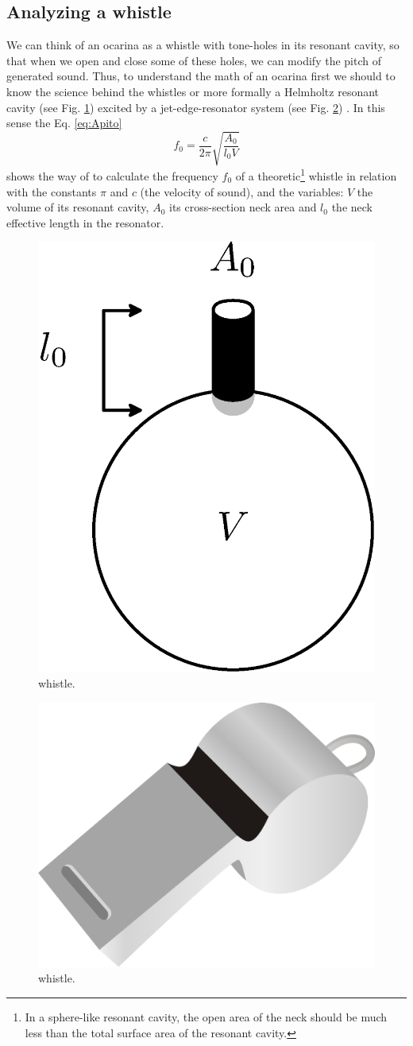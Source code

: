 \documentclass[11pt,twocolumn]{article}
\begin{document}
\subsection{Analyzing a whistle}
We can think of an ocarina as a whistle with tone-holes in its resonant cavity,
so that when we open and close some of these holes, we can modify the pitch of generated sound.
Thus, to understand the math of an ocarina first we should to know the science behind the whistles  
or more formally a Helmholtz resonant cavity \cite{corning2011resonance} (see Fig. \ref{fig:resonador}) excited by a jet-edge-resonator system (see Fig. \ref{football-referee-whistle}) \cite[pp. 3]{gibiat2013acoustic} \cite[pp. 138]{nyborg1953characteristics}. 
In this sense the Eq. \ref{eq:Apito} 
\begin{equation} 
\label{eq:Apito}
 f_0 = \frac{c}{2 \pi} \sqrt{\frac{A_{0}}{l_{0}V} }  
\end{equation}
shows the way of to calculate the frequency $f_0$ of a theoretic\footnote{In  a sphere-like resonant cavity, the open area of the neck should be much less than the total surface area of the resonant cavity.} whistle \cite[pp. 3]{gibiat2013acoustic} \cite[pp. 5]{kobayashi20093d} \cite[pp. 265]{okadanumerical}
in relation with the constants $\pi$  and $c$ (the velocity of sound), and 
the variables: $V$ the volume of its resonant cavity,
$A_0$ its cross-section neck area and $l_0$ the neck effective length in the resonator.


\begin{figure}[ht!]
\centering
\includegraphics[width=0.350\columnwidth]{resonador.eps}
\caption{whistle. }
\label{fig:resonador}
\end{figure}

\begin{figure}[ht!]
\centering
\includegraphics[width=0.250\columnwidth]{football-referee-whistle.eps}
\caption{whistle. }
\label{football-referee-whistle}
\end{figure}
\end{document}
